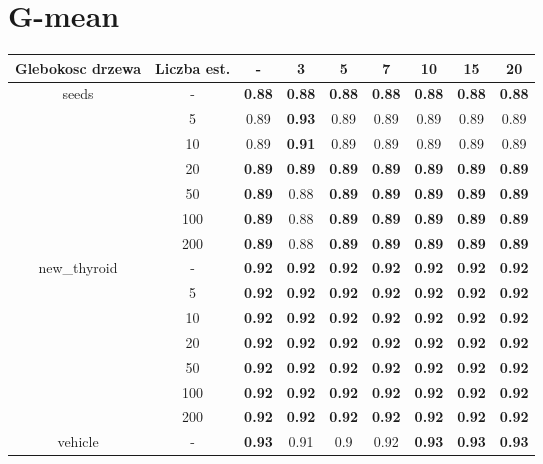 \documentclass{article}%
\begin{document}
%
\section*{G{-}mean}%
\begin{longtable}{c|c|ccccccc}%
\hline%
Glebokosc drzewa&Liczba est.&{-}&3&5&7&10&15&20\\%
\hline%
\multirow{7}{*}{seeds}&{-}&\textbf{0.88}&\textbf{0.88}&\textbf{0.88}&\textbf{0.88}&\textbf{0.88}&\textbf{0.88}&\textbf{0.88}\\%
\cline{2%
-%
9}%
&5&0.89&\textbf{0.93}&0.89&0.89&0.89&0.89&0.89\\%
\cline{2%
-%
9}%
&10&0.89&\textbf{0.91}&0.89&0.89&0.89&0.89&0.89\\%
\cline{2%
-%
9}%
&20&\textbf{0.89}&\textbf{0.89}&\textbf{0.89}&\textbf{0.89}&\textbf{0.89}&\textbf{0.89}&\textbf{0.89}\\%
\cline{2%
-%
9}%
&50&\textbf{0.89}&0.88&\textbf{0.89}&\textbf{0.89}&\textbf{0.89}&\textbf{0.89}&\textbf{0.89}\\%
\cline{2%
-%
9}%
&100&\textbf{0.89}&0.88&\textbf{0.89}&\textbf{0.89}&\textbf{0.89}&\textbf{0.89}&\textbf{0.89}\\%
\cline{2%
-%
9}%
&200&\textbf{0.89}&0.88&\textbf{0.89}&\textbf{0.89}&\textbf{0.89}&\textbf{0.89}&\textbf{0.89}\\%
\hline%
\multirow{7}{*}{new\_thyroid}&{-}&\textbf{0.92}&\textbf{0.92}&\textbf{0.92}&\textbf{0.92}&\textbf{0.92}&\textbf{0.92}&\textbf{0.92}\\%
\cline{2%
-%
9}%
&5&\textbf{0.92}&\textbf{0.92}&\textbf{0.92}&\textbf{0.92}&\textbf{0.92}&\textbf{0.92}&\textbf{0.92}\\%
\cline{2%
-%
9}%
&10&\textbf{0.92}&\textbf{0.92}&\textbf{0.92}&\textbf{0.92}&\textbf{0.92}&\textbf{0.92}&\textbf{0.92}\\%
\cline{2%
-%
9}%
&20&\textbf{0.92}&\textbf{0.92}&\textbf{0.92}&\textbf{0.92}&\textbf{0.92}&\textbf{0.92}&\textbf{0.92}\\%
\cline{2%
-%
9}%
&50&\textbf{0.92}&\textbf{0.92}&\textbf{0.92}&\textbf{0.92}&\textbf{0.92}&\textbf{0.92}&\textbf{0.92}\\%
\cline{2%
-%
9}%
&100&\textbf{0.92}&\textbf{0.92}&\textbf{0.92}&\textbf{0.92}&\textbf{0.92}&\textbf{0.92}&\textbf{0.92}\\%
\cline{2%
-%
9}%
&200&\textbf{0.92}&\textbf{0.92}&\textbf{0.92}&\textbf{0.92}&\textbf{0.92}&\textbf{0.92}&\textbf{0.92}\\%
\hline%
\multirow{7}{*}{vehicle}&{-}&\textbf{0.93}&0.91&0.9&0.92&\textbf{0.93}&\textbf{0.93}&\textbf{0.93}\\%

\end{longtable}
\end{document}
